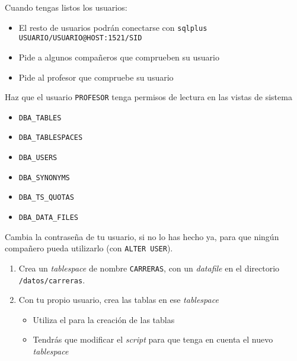 \begin{homeworkProblem}
  Cuando tengas listos los usuarios:
  \begin{itemize}
    \item El resto de usuarios podrán conectarse con \texttt{sqlplus USUARIO/USUARIO@HOST:1521/SID}
    \item Pide a algunos compañeros que comprueben su usuario
    \item Pide al profesor que compruebe su usuario
  \end{itemize}
\end{homeworkProblem}

\begin{homeworkProblem}
  Haz que el usuario \texttt{PROFESOR} tenga permisos de lectura en las vistas de sistema
  \begin{itemize}
  \item \texttt{DBA\_TABLES}
  \item \texttt{DBA\_TABLESPACES}
  \item \texttt{DBA\_USERS}
  \item \texttt{DBA\_SYNONYMS} 
  \item \texttt{DBA\_TS\_QUOTAS} 
  \item \texttt{DBA\_DATA\_FILES}
  \end{itemize}
\end{homeworkProblem}

\begin{homeworkProblem}
  Cambia la contraseña de tu usuario, si no lo has hecho ya, para que ningún compañero pueda utilizarlo (con \texttt{ALTER USER}).

  \begin{enumerate}
  \item Crea un \textit{tablespace} de nombre \texttt{CARRERAS}, con un \textit{datafile} en el directorio \texttt{/datos/carreras}.
  \item Con tu propio usuario, crea las tablas en ese \textit{tablespace}
    \begin{itemize}
    \item Utiliza el  para la creación de las tablas
    \item Tendrás que modificar el \textit{script} para que tenga en cuenta el nuevo \textit{tablespace}
    \end{itemize}
  \end{enumerate}
\end{homeworkProblem}

